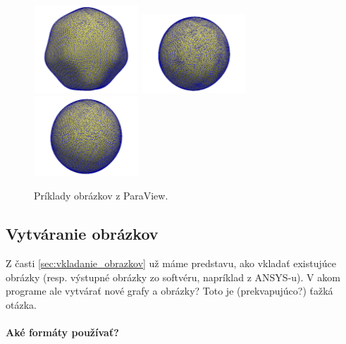 \begin{figure}[p]
	\hspace{0.1\textwidth}
	\includegraphics[width=0.35\textwidth]{bumpy_omega100_level5_tstep50.png}
	\newline
	\includegraphics[width=0.35\textwidth]{bumpy_noRed_level5_tstep128.png}
	\hspace{0.1\textwidth}
	\includegraphics[width=0.35\textwidth]{bumpy_omega100_level5_tstep128.png}
	\newline
	\caption{Príklady obrázkov z ParaView.}\label{fig:bumpy_sphere} 
\end{figure}

\subsection{Vytváranie obrázkov}

Z časti \ref{sec:vkladanie_obrazkov} už máme predstavu, ako vkladať existujúce obrázky (resp. výstupné obrázky zo softvéru, napríklad z ANSYS-u). V akom programe ale vytvárať nové grafy a obrázky? Toto je (prekvapujúco?) ťažká otázka.

\paragraph{Aké formáty používať?}

